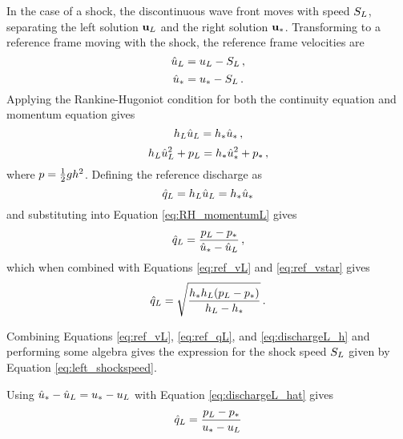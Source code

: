In the case of a shock, the discontinuous wave front moves with speed
$S_L$, separating the left solution $\mathbf{u}_L$ and the right
solution $\mathbf{u}_*$. Transforming to a reference frame moving with the
shock, the reference frame velocities are
\begin{equation}\label{eq:ref_vL}
  \hat{u}_L = u_L - S_L \,,
\end{equation}
\begin{equation}\label{eq:ref_vstar}
  \hat{u}_* = u_* - S_L \,.
\end{equation}
Applying the Rankine-Hugoniot condition for both the continuity equation and
momentum equation gives
\begin{equation}
  h_L\hat{u}_L = h_*\hat{u}_* \,,
\end{equation}
\begin{equation}\label{eq:RH_momentumL}
  h_L\hat{u}_L^2 + p_L
    = h_*\hat{u}_*^2 + p_*
    \,,
\end{equation}
where $p = \frac{1}{2}gh^2$.
Defining the reference discharge as
\begin{equation}\label{eq:ref_qL}
  \hat{q}_L = h_L\hat{u}_L = h_*\hat{u}_*
\end{equation}
and substituting into Equation \eqref{eq:RH_momentumL} gives
\begin{equation}\label{eq:dischargeL_hat}
  \hat{q}_L = \frac{p_L - p_*}
    {\hat{u}_* - \hat{u}_L}
    \,,
\end{equation}
which when combined with Equations \eqref{eq:ref_vL} and \eqref{eq:ref_vstar}
gives
\begin{equation}\label{eq:dischargeL_h}
  \hat{q}_L = \sqrt{\frac{h_*h_L
    (p_L - p_*)}
    {h_L - h_*}}
    \,.
\end{equation}
\begin{remark}
Combining Equations \eqref{eq:ref_vL}, \eqref{eq:ref_qL}, and \eqref{eq:dischargeL_h}
and performing some algebra gives the expression for the shock speed $S_L$
given by Equation \eqref{eq:left_shockspeed}.
\end{remark}
Using $\hat{u}_* - \hat{u}_L = u_* - u_L$
with Equation \eqref{eq:dischargeL_hat} gives
\begin{equation}
  \hat{q}_L = \frac{p_L - p_*}
    {u_* - u_L}
\end{equation}
